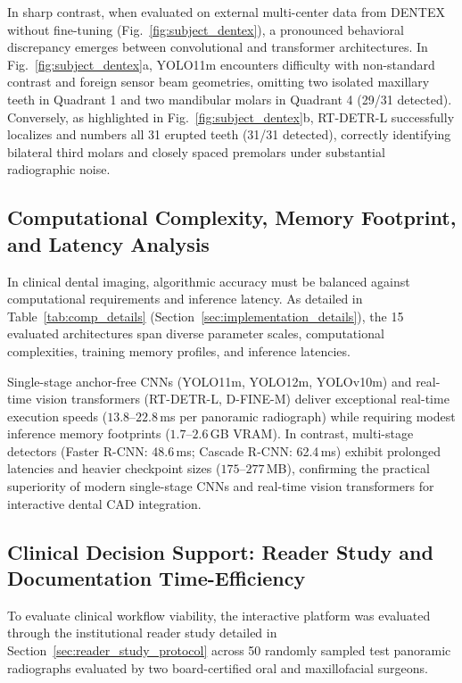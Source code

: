 \documentclass[10pt,journal,compsoc]{IEEEtran}
\begin{document}
In sharp contrast, when evaluated on external multi-center data from DENTEX without fine-tuning (Fig.~\ref{fig:subject_dentex}), a pronounced behavioral discrepancy emerges between convolutional and transformer architectures. In Fig.~\ref{fig:subject_dentex}a, YOLO11m encounters difficulty with non-standard contrast and foreign sensor beam geometries, omitting two isolated maxillary teeth in Quadrant 1 and two mandibular molars in Quadrant 4 (29/31 detected). Conversely, as highlighted in Fig.~\ref{fig:subject_dentex}b, RT-DETR-L successfully localizes and numbers all 31 erupted teeth (31/31 detected), correctly identifying bilateral third molars and closely spaced premolars under substantial radiographic noise.

\subsection{Computational Complexity, Memory Footprint, and Latency Analysis}
In clinical dental imaging, algorithmic accuracy must be balanced against computational requirements and inference latency. As detailed in Table~\ref{tab:comp_details} (Section~\ref{sec:implementation_details}), the 15 evaluated architectures span diverse parameter scales, computational complexities, training memory profiles, and inference latencies.

Single-stage anchor-free CNNs (YOLO11m, YOLO12m, YOLOv10m) and real-time vision transformers (RT-DETR-L, D-FINE-M) deliver exceptional real-time execution speeds ($13.8\text{--}22.8$\,ms per panoramic radiograph) while requiring modest inference memory footprints ($1.7\text{--}2.6$\,GB VRAM). In contrast, multi-stage detectors (Faster R-CNN: 48.6\,ms; Cascade R-CNN: 62.4\,ms) exhibit prolonged latencies and heavier checkpoint sizes ($175\text{--}277$\,MB), confirming the practical superiority of modern single-stage CNNs and real-time vision transformers for interactive dental CAD integration.

\subsection{Clinical Decision Support: Reader Study and Documentation Time-Efficiency}
\label{sec:reader_study_results}
To evaluate clinical workflow viability, the interactive platform was evaluated through the institutional reader study detailed in Section~\ref{sec:reader_study_protocol} across 50 randomly sampled test panoramic radiographs evaluated by two board-certified oral and maxillofacial surgeons. 
\end{document}
